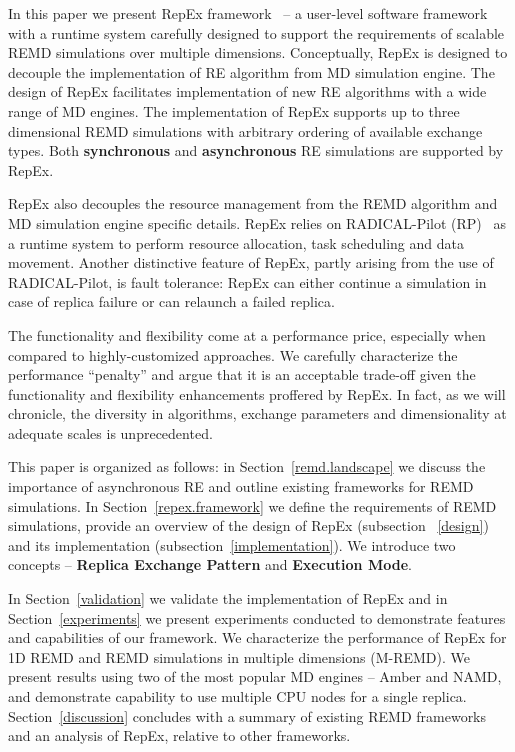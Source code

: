 \documentclass{sig-alternate-05-2015}
\begin{document}
In this paper we present RepEx framework~\cite{repex-code} -- a user-level software framework with a runtime system carefully designed to support the requirements of scalable REMD simulations over multiple dimensions.  Conceptually, RepEx is designed to decouple the implementation of RE algorithm from MD simulation engine. The design of RepEx facilitates implementation of new RE algorithms with a wide range of MD engines.  The implementation of RepEx supports up to three dimensional REMD simulations with arbitrary ordering of available exchange types. 
Both \textbf{synchronous} and \textbf{asynchronous} RE simulations are supported by RepEx.

RepEx also decouples the resource management from the REMD algorithm and MD simulation engine specific details. RepEx relies on RADICAL-Pilot (RP)~\cite{review_radicalpilot_2015} as a runtime system to perform resource allocation, task scheduling and data movement. Another distinctive feature of RepEx, partly arising from the use of RADICAL-Pilot, is fault tolerance: RepEx can either continue a simulation in case of replica failure or can relaunch a failed replica. 

The functionality and flexibility come at a performance price, especially when compared to highly-customized approaches. We carefully characterize the performance ``penalty'' and argue that it is an acceptable trade-off given the functionality and flexibility enhancements proffered by RepEx. In fact, as we will chronicle, the diversity in algorithms, exchange parameters and dimensionality at adequate scales is unprecedented.

This paper is organized as follows: in Section~\ref{remd.landscape} we discuss the importance of asynchronous RE and outline existing frameworks for REMD simulations.  In Section~\ref{repex.framework} we define the requirements of REMD simulations, provide an overview of the design of RepEx (subsection ~\ref{design}) and its implementation (subsection~\ref{implementation}). We introduce two concepts -- \textbf{Replica Exchange Pattern} and \textbf{Execution Mode}. 

In Section~\ref{validation} we validate the implementation of RepEx and in Section~\ref{experiments} we present experiments conducted to demonstrate features and capabilities of our framework. We characterize the performance of RepEx for 1D REMD and REMD simulations in multiple dimensions (M-REMD). We present results using two of the most popular MD engines -- Amber and NAMD, and demonstrate capability to use multiple CPU nodes for a single replica. Section~\ref{discussion} concludes with a summary of existing REMD frameworks and an analysis of RepEx, relative to other frameworks.
\end{document}
